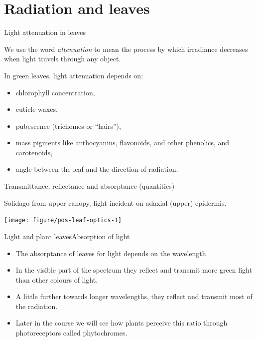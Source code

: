 \documentclass[10pt]{beamer}\usepackage[]{graphicx}\usepackage[]{color}
\newenvironment{knitrout}{}{} %
\begin{document}
\section{Radiation and leaves}

\begin{frame}{Light attenuation in leaves}

    We use the word \emph{attenuation} to mean the process by which irradiance decreases when light travels through any object.
    \vspace{1ex}

    In green leaves, light attenuation depends on:\\
    \begin{itemize}
        \item chlorophyll concentration,
        \item cuticle waxes,
        \item pubescence (trichomes or ``hairs''),
        \item mass pigments like anthocyanins, flavonoids, and other phenolics, and carotenoids,
        \item angle between the leaf and the direction of radiation.
    \end{itemize}
\end{frame}

\begin{frame}[fragile]{Transmittance, reflectance and absorptance (quantities)}

Solidago from upper canopy, light incident on adaxial (upper) epidermis.

\begin{knitrout}\tiny
{}\color{fgcolor}

{\centering \texttt{[image: figure/pos-leaf-optics-1]} 

}


\end{knitrout}

\end{frame}

\begin{frame}{Light and plant leaves}{Absorption of light}
    \begin{itemize}
        \item The absorptance of leaves for light depends on the
        wavelength.
        \item In the visible part of the spectrum they reflect and
        transmit more green light than other colours of light.
        \item A little further towards longer wavelengths, they
        reflect and transmit most of the radiation.
        \item Later in the course we will see how plants perceive
        this ratio through photoreceptors called phytochromes.
    \end{itemize}
\end{frame}
\end{document}

